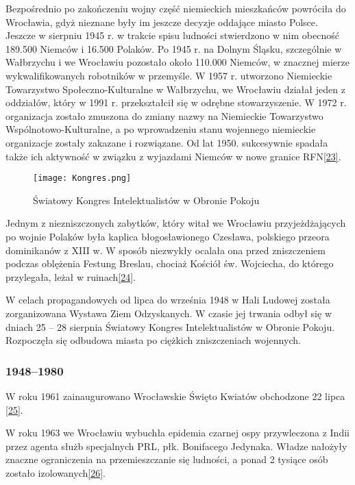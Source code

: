 \documentclass{article}
\begin{document}
Bezpośrednio po zakończeniu wojny część niemieckich mieszkańców powróciła do Wrocławia, gdyż nieznane były im jeszcze decyzje oddające miasto Polsce. Jeszcze w sierpniu 1945 r. w trakcie spisu ludności stwierdzono w nim obecność 189.500 Niemców i 16.500 Polaków. Po 1945 r. na Dolnym Śląsku, szczególnie w Wałbrzychu i we Wrocławiu pozostało około 110.000 Niemców, w znacznej mierze wykwalifikowanych robotników w przemyśle. W 1957 r. utworzono Niemieckie Towarzystwo Społeczno-Kulturalne w Wałbrzychu, we Wrocławiu działał jeden z oddziałów, który w 1991 r. przekształcił się w odrębne stowarzyszenie. W 1972 r. organizacja zostało zmuszona do zmiany nazwy na Niemieckie Towarzystwo Wspólnotowo-Kulturalne, a po wprowadzeniu stanu wojennego niemieckie organizacje zostały zakazane i rozwiązane. Od lat 1950. sukcesywnie spadała także ich aktywność w związku z wyjazdami Niemców w nowe granice RFN\hyperref[23]{[23]}.

\begin{wrapfigure}{r}{0.41\textwidth} 
\begin{center}
\vspace{-20pt}
\texttt{[image: Kongres.png]}
\end{center}
\vspace{-20pt}
\caption{Światowy Kongres Intelektualistów w Obronie Pokoju}
\vspace{-10pt}
\end{wrapfigure}

Jednym z niezniszczonych zabytków, który witał we Wrocławiu przyjeżdżających po wojnie Polaków była kaplica błogosławionego Czesława, polskiego przeora dominikanów z XIII w. W sposób niezwykły ocalała ona przed zniszczeniem podczas oblężenia Festung Breslau, chociaż Kościół św. Wojciecha, do którego przylegała, leżał w ruinach\hyperref[24]{[24]}.

W celach propagandowych od lipca do września 1948 w Hali Ludowej została zorganizowana Wystawa Ziem Odzyskanych. W czasie jej trwania odbył się w dniach 25 – 28 sierpnia Światowy Kongres Intelektualistów w Obronie Pokoju. Rozpoczęła się odbudowa miasta po ciężkich zniszczeniach wojennych.

\subsubsection{1948–1980}
W roku 1961 zainaugurowano Wrocławskie Święto Kwiatów obchodzone 22 lipca \hyperref[25]{[25]}.

W roku 1963 we Wrocławiu wybuchła epidemia czarnej ospy przywleczona z Indii przez agenta służb specjalnych PRL, płk. Bonifacego Jedynaka. Władze nałożyły znaczne ograniczenia na przemieszczanie się ludności, a ponad 2 tysiące osób zostało izolowanych\hyperref[26]{[26]}.
\end{document}
